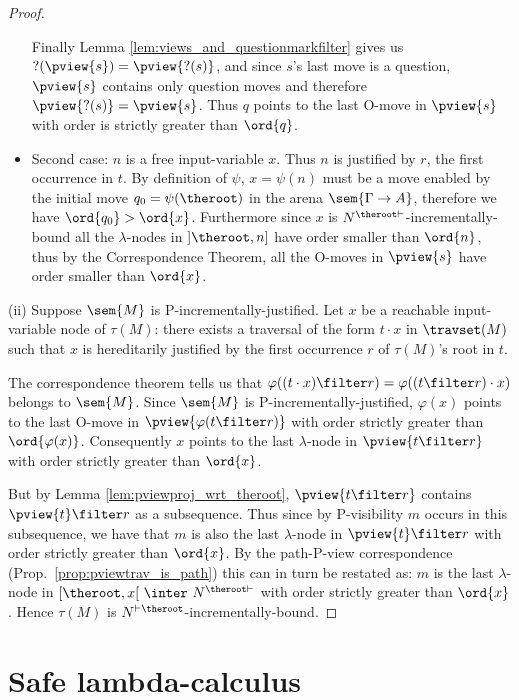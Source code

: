\begin{proof}
\begin{itemize}
Finally Lemma \ref{lem:views_and_questionmarkfilter} gives us
$?(\pview{s}) = \pview{?(s)}$, and since $s$'s last move is a
question, $\pview{s}$ contains only question moves and therefore
$\pview{?(s)} = \pview{s}$. Thus $q$ points to the last O-move
in $\pview{s}$ with order is strictly greater than $\ord{q}$.


\item  Second case: $n$ is a free input-variable $x$.
Thus $n$ is justified by $r$, the first occurrence in $t$. By
definition of $\psi$, $x = \psi(n)$ must be a move enabled by
the initial move $q_0 = \psi(\theroot)$ in the arena
$\sem{\Gamma \rightarrow A}$, therefore we have $\ord{q_0} >
\ord{x}$. Furthermore since  $x$ is
$N^{\theroot\vdash}$-incrementally-bound all the $\lambda$-nodes
in $]\theroot,n]$ have order smaller than $\ord{n}$, thus by the
Correspondence Theorem, all the O-moves in $\pview{s}$ have
order smaller than $\ord{x}$.
\end{itemize}

\noindent (ii) Suppose $\sem{M}$ is P-incrementally-justified. Let
$x$ be a reachable input-variable node of $\tau(M)$: there exists a
traversal of the form $t \cdot x$ in $\travset(M)$ such that $x$ is
hereditarily justified by the first occurrence $r$ of $\tau(M)$'s
root in $t$.

The correspondence theorem tells us that $\varphi((t \cdot x)
\filter r) = \varphi((t \filter r) \cdot x)$ belongs to $\sem{M}$.
Since $\sem{M}$ is P-incrementally-justified, $\varphi(x)$ points to
the last O-move in $\pview{\varphi(t \filter r)}$ with order
strictly greater than $\ord{\varphi(x)}$. Consequently $x$ points to
the last $\lambda$-node in $\pview{t \filter r}$ with order strictly
greater than $\ord{x}$.

But by Lemma \ref{lem:pviewproj_wrt_theroot}, $\pview{t \filter r}$
contains $\pview{t} \filter r$ as a subsequence. Thus since by
P-visibility $m$ occurs in this subsequence, we have that $m$ is
also the last $\lambda$-node in $\pview{t} \filter r$ with order
strictly greater than $\ord{x}$. By the path-P-view correspondence
(Prop.\ \ref{prop:pviewtrav_is_path}) this can in turn be restated
as: $m$ is the last $\lambda$-node in $[\theroot,x[\  \inter\
N^{\theroot \vdash}$ with order strictly greater than $\ord{x}$.
Hence $\tau(M)$ is $N^{\vdash \theroot}$-incrementally-bound.
\end{proof}

\section{Safe lambda-calculus}


